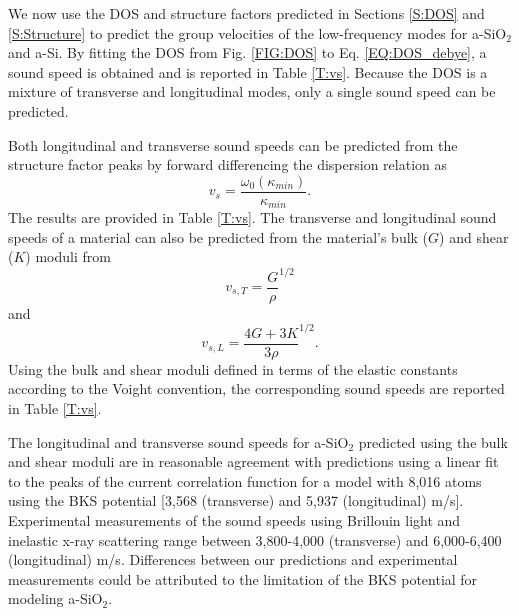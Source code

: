 \documentclass[aps,prb,onecolumn,preprint,superscriptaddress,footinbib,amsmath,amssymb,floatfix]{revtex4}
\begin{document}
We now use the DOS and structure factors predicted in 
Sections \ref{S:DOS} and \ref{S:Structure} to 
predict the group velocities of the low-frequency modes for 
a-SiO$_2$ and a-Si. By fitting the DOS 
from Fig. \ref{FIG:DOS} to Eq. \eqref{EQ:DOS_debye}, 
a sound speed is obtained and is  
reported in Table \ref{T:vs}. Because the DOS is a mixture of 
transverse and longitudinal modes, only a single sound speed can be 
predicted. 

Both longitudinal and transverse sound speeds can be predicted from 
the structure factor peaks by forward differencing the dispersion relation as
\begin{equation}\label{EQ:vs_dwdk}
v_{s} = \frac{\omega_0(\kappa_{min})}{\kappa_{min}}.
\end{equation}
The results are provided in Table \ref{T:vs}. 
The transverse and longitudinal sound speeds of a material can 
also be predicted from the material's bulk ($G$) and 
shear ($K$) moduli from 
\begin{equation}\label{EQ:vs_T_elas}
v_{s,T} = \frac{G}{\rho}^{1/2}
\end{equation}
and 
\begin{equation}\label{EQ:vs_L_elas}
v_{s,L} = \frac{4G + 3K}{3\rho}^{1/2}.
\end{equation}
Using the bulk and shear moduli defined in terms of the elastic 
constants according to the Voight convention,\cite{gale_general_2003}  
the corresponding sound speeds are reported in Table \ref{T:vs}. 

The longitudinal and transverse sound speeds for 
a-SiO$_2$ predicted using the bulk and shear moduli are in reasonable 
agreement with predictions using a linear fit to the peaks of the 
current correlation function for a model with 
8,016 atoms using the BKS potential 
[3,568 (transverse) and 5,937 (longitudinal) m/s].
\cite{horbach_high_2001} Experimental measurements of the 
sound speeds using Brillouin light and inelastic x-ray 
scattering range between 3,800-4,000 (transverse) and 
6,000-6,400 (longitudinal) m/s.
\cite{vacher_ultrasonic_1981,benassi_evidence_1996,
ruocco_high-frequency_2001,polian_elastic_2002,
ruzicka_evidence_2004} Differences between our predictions and 
experimental measurements could be attributed to the limitation of the 
BKS potential for modeling a-SiO$_2$. 
\end{document}
